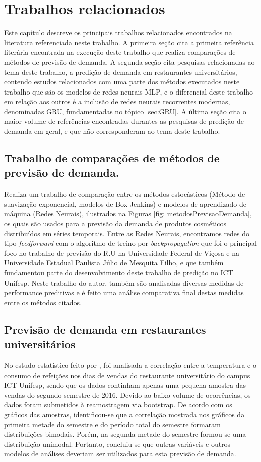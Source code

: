 \chapter{Trabalhos relacionados} \label{cap:literatura}
  
Este capítulo descreve os principais trabalhos relacionados encontrados na literatura referenciada neste trabalho. A primeira seção cita a primeira referência literária encontrada na execução deste trabalho que realiza comparações de métodos de previsão de demanda. A segunda seção cita pesquisas relacionadas ao tema deste trabalho, a predição de demanda em restaurantes universitários, contendo estudos relacionados com uma parte dos métodos executados neste trabalho que são os modelos de redes neurais MLP, e o diferencial deste trabalho em relação aos outros é a inclusão de redes neurais recorrentes modernas, denominadas GRU, fundamentadas no tópico \ref{sec:GRU}. A última seção cita o maior volume de referências encontradas durantes as pesquisas de predição de demanda em geral, e que não corresponderam ao tema deste trabalho.

    \section{Trabalho de comparações de métodos de previsão de demanda.}
        Realiza um trabalho de comparação entre os métodos estocásticos (Método de suavização exponencial, modelos de Box-Jenkins) e modelos de aprendizado de máquina (Redes Neurais), ilustrados na Figuras \ref{fig: metodosPrevisaoDemanda}, os quais são usados para a previsão da demanda de produtos cosméticos distribuídos em séries temporais. Entre as Redes Neurais, encontramos redes do tipo \textit{feedforward} com o algoritmo de treino por \textit{backpropagation} que foi o principal foco no trabalho de previsão do R.U na Universidade Federal de Viçosa e na Universidade Estadual Paulista Júlio de Mesquita Filho, e que também fundamentou parte do desenvolvimento deste trabalho de predição no ICT Unifesp. Neste trabalho do autor, também são analisadas diversas medidas de performance preditivas e é feito uma análise comparativa final destas medidas entre os métodos citados.
    
    \section{Previsão de demanda em restaurantes universitários}
        No estudo estatístico feito por , foi analisada a correlação entre a temperatura e o consumo de refeições nos dias de vendas do restaurante universitário do campus ICT-Unifesp, sendo que os dados continham apenas uma pequena amostra das vendas do segundo semestre de 2016. Devido ao baixo volume de ocorrências, os dados foram submetidos à reamostragem via bootstrap. De acordo com os gráficos das amostras, identificou-se que a correlação mostrada nos gráficos da primeira metade do semestre e do período total do semestre formaram distribuições bimodais. Porém, na segunda metade do semestre formou-se uma distribuição unimodal. Portanto, concluiu-se que outras variáveis e outros modelos de análises deveriam ser utilizados para esta previsão de demanda.
        
